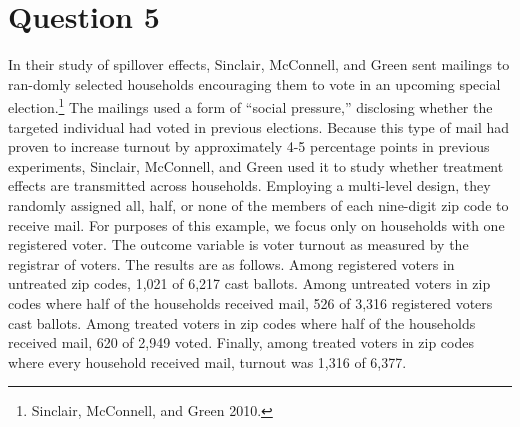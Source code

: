 \documentclass[11pt,notitlepage]{article}\usepackage[]{graphicx}\usepackage[]{color}
\begin{document}
\section*{Question 5}
In their study of spillover effects, Sinclair, McConnell, and Green sent mailings to ran-domly selected households encouraging them to vote in an upcoming special election.\footnote{Sinclair, McConnell, and Green 2010.} The mailings used a form of ``social pressure,'' disclosing whether the targeted individual had voted in previous elections. Because this type of mail had proven to increase turnout by approximately 4-5 percentage points in previous experiments, Sinclair, McConnell, and Green used it to study whether treatment effects are transmitted across households. Employing a multi-level design, they randomly assigned all, half, or none of the members of each nine-digit zip code to receive mail. For purposes of this example, we focus only on households with one registered voter. The outcome variable is voter turnout as measured by the registrar of voters. The results are as follows. Among registered voters in untreated zip codes, 1,021 of 6,217 cast ballots. Among untreated voters in zip codes where half of the households received mail, 526 of 3,316 registered voters cast ballots. Among treated voters in zip codes where half of the households received mail, 620 of 2,949 voted. Finally, among treated voters in zip codes where every household received mail, turnout was 1,316 of 6,377.
\end{document}
